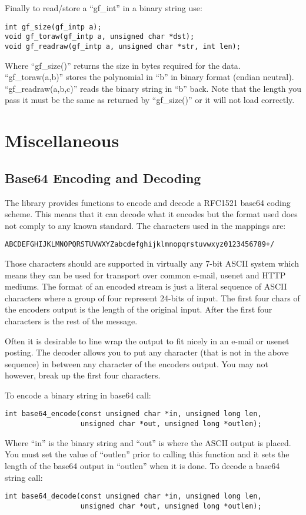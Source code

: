 \documentclass{book}
\begin{document}
Finally to read/store a ``gf\_int'' in a binary string use:
   
\begin{verbatim}
int gf_size(gf_intp a);
void gf_toraw(gf_intp a, unsigned char *dst);
void gf_readraw(gf_intp a, unsigned char *str, int len);
\end{verbatim}
Where ``gf\_size()'' returns the size in bytes required for the data.  ``gf\_toraw(a,b)'' stores the polynomial in ``b''
in binary format (endian neutral).  ``gf\_readraw(a,b,c)'' reads the binary string in ``b'' back.  Note that the length 
you pass it must be the same as returned by ``gf\_size()'' or it will not load correctly.

\chapter{Miscellaneous}
\section{Base64 Encoding and Decoding}
The library provides functions to encode and decode a RFC1521 base64 coding scheme.  This means that it can decode what it 
encodes but the format used does not comply to any known standard.  The characters used in the mappings are:
\begin{verbatim}
ABCDEFGHIJKLMNOPQRSTUVWXYZabcdefghijklmnopqrstuvwxyz0123456789+/
\end{verbatim}
Those characters should are supported in virtually any 7-bit ASCII system which means they can be used for transport over
common e-mail, usenet and HTTP mediums.  The format of an encoded stream is just a literal sequence of ASCII characters
where a group of four represent 24-bits of input.  The first four chars of the encoders output is the length of the 
original input.  After the first four characters is the rest of the message.

Often it is desirable to line wrap the output to fit nicely in an e-mail or usenet posting.  The decoder allows you to
put any character (that is not in the above sequence) in between any character of the encoders output.  You may not however,
break up the first four characters.

To encode a binary string in base64 call:
   
\begin{verbatim}
int base64_encode(const unsigned char *in, unsigned long len, 
                  unsigned char *out, unsigned long *outlen);
\end{verbatim}
Where ``in'' is the binary string and ``out'' is where the ASCII output is placed.  You must set the value of ``outlen'' prior
to calling this function and it sets the length of the base64 output in ``outlen'' when it is done.  To decode a base64 
string call:
\begin{verbatim}
int base64_decode(const unsigned char *in, unsigned long len, 
                  unsigned char *out, unsigned long *outlen);
\end{verbatim}
\end{document}
